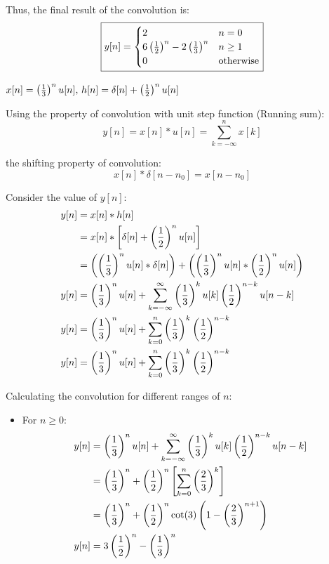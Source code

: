 \documentclass[a4paper, 10pt]{article}
\begin{document}
\begin{tosubmit}
Thus, the final result of the convolution is:
\[ \boxed{
y[n] = \begin{cases}
2 & n = 0 \\
6 \left( \frac{1}{2} \right)^n - 2 \left( \frac{1}{3} \right)^n & n \geq 1 \\
0 & \text{otherwise}
\end{cases}
} \]
\end{tosubmit}

\newpage

\begin{subproblems}[start=4]
    \item \( x[n] = \left( \frac{1}{3} \right)^n u[n],\, h[n] = \delta[n] + \left( \frac{1}{2} \right)^n u[n] \)
\end{subproblems}

\begin{solution}
Using the property of convolution with unit step function (Running sum):
\[ y[n] = x[n] * u[n] = \sum_{k=-\infty}^{n} x[k] \]

the shifting property of convolution:
\[ x[n] * \delta[n - n_0] = x[n - n_0] \]

Consider the value of \( y[n] \):
\begin{align*}
    y[n] &= x[n] * h[n] \\
    &= x[n] * \left[ \delta[n] + \left( \frac{1}{2} \right)^n u[n] \right] \\
    &= \left( \left( \frac{1}{3} \right)^n u[n] * \delta[n] \right) + \left( \left( \frac{1}{3} \right)^n u[n] * \left( \frac{1}{2} \right)^n u[n] \right) \\
    y[n] &= \left( \frac{1}{3} \right)^n u[n] + \sum_{k=-\infty}^{\infty} \left( \frac{1}{3} \right)^k u[k] \left( \frac{1}{2} \right)^{n - k} u[n - k] \\
    y[n] &= \left( \frac{1}{3} \right)^n u[n] + \sum_{k=0}^{n} \left( \frac{1}{3} \right)^k \left( \frac{1}{2} \right)^{n - k} \\
    y[n] &= \left( \frac{1}{3} \right)^n u[n] + \sum_{k=0}^{n} \left( \frac{1}{3} \right)^k \left( \frac{1}{2} \right)^{n - k} \\
\end{align*}

Calculating the convolution for different ranges of \( n \):
\begin{itemize}
    \item For \( n \geq 0 \):
    \begin{align*}
        y[n] &= \left( \frac{1}{3} \right)^n u[n] + \sum_{k=-\infty}^{\infty} \left( \frac{1}{3} \right)^k u[k] \left( \frac{1}{2} \right)^{n - k} u[n - k] \\
        &= \left( \frac{1}{3} \right)^n + \left( \frac{1}{2} \right)^n \left[ \sum_{k=0}^{n} \left( \frac{2}{3} \right)^k \right] \\
        &= \left( \frac{1}{3} \right)^n + \left( \frac{1}{2} \right)^n \cot (3) \left( 1 - \left( \frac{2}{3} \right)^{n + 1} \right) \\
        y[n] &= 3 \left( \frac{1}{2} \right)^n - \left( \frac{1}{3} \right)^{n}
    \end{align*}
\end{itemize}


\end{solution}
\end{document}
